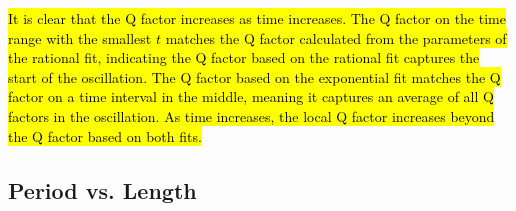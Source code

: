 \documentclass[12pt]{article}
\DeclareRobustCommand{\hlnew}[1]{{\sethlcolor{hlcnew}\hl{#1}}}
\begin{document}
\hlnew{It is clear that the Q factor increases as time increases. The Q factor on the time range with the smallest $t$ matches the Q factor calculated from the parameters of the rational fit, indicating the Q factor based on the rational fit captures the start of the oscillation. The Q factor based on the exponential fit matches the Q factor on a time interval in the middle, meaning it captures an average of all Q factors in the oscillation. As time increases, the local Q factor increases beyond the Q factor based on both fits.}



\subsection{Period vs. Length} \label{section:period-length}
\end{document}
